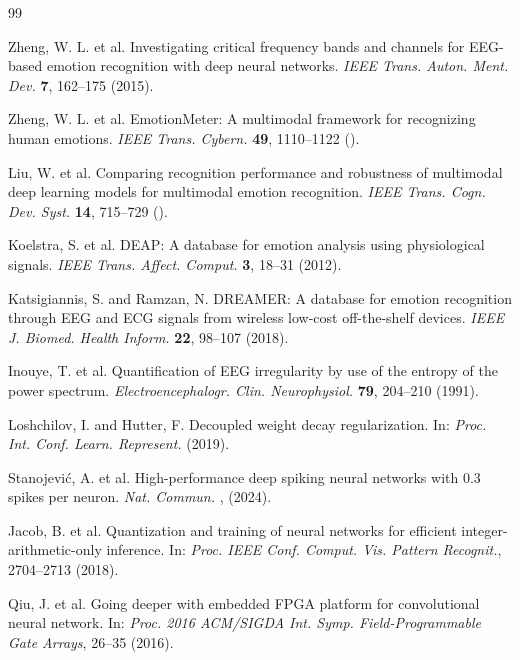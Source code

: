 \documentclass[12pt]{article}
\providecommand{\DIFaddtex}[1]{{\protect\color{blue}\sf #1}}
\providecommand{\DIFadd}[1]{\texorpdfstring{\DIFaddtex{#1}}{#1}}
\providecommand{\DIFaddbegin}{}
\providecommand{\DIFaddend}{}
\begin{document}
 \begin{thebibliography}{99}

Zheng, W. L. et al.
Investigating critical frequency bands and channels for EEG-based emotion recognition with deep neural networks.
\textit{IEEE Trans. Auton. Ment. Dev.} \textbf{7}, 162--175 (2015).

Zheng, W. L. et al.
EmotionMeter: A multimodal framework for recognizing human emotions.
\textit{IEEE Trans. Cybern.} \textbf{49}, 1110--1122 (\DIFaddbegin \DIFadd{2019}\DIFaddend).

Liu, W. et al.
Comparing recognition performance and robustness of multimodal deep learning models for multimodal emotion recognition.
\textit{IEEE Trans. Cogn. Dev. Syst.} \textbf{14}, 715--729 (\DIFaddbegin \DIFadd{2022}\DIFaddend).

Koelstra, S. et al.
DEAP: A database for emotion analysis using physiological signals.
\textit{IEEE Trans. Affect. Comput.} \textbf{3}, 18--31 (2012).

Katsigiannis, S. and Ramzan, N.
DREAMER: A database for emotion recognition through EEG and ECG signals \DIFaddbegin \DIFadd{from wireless low-cost off-the-shelf devices}\DIFaddend .
\textit{IEEE J. Biomed. Health Inform.} \textbf{22}, 98--107 (2018).

Inouye, T. et al.
Quantification of EEG irregularity by use of the entropy of the power spectrum.
\textit{Electroencephalogr. Clin. Neurophysiol.} \textbf{79}, 204--210 (1991).

 \DIFaddbegin {}
\DIFadd{Loshchilov, I. and Hutter, F.
Decoupled weight decay regularization.
In: \textit{Proc. Int. Conf. Learn. Represent.} (2019).
}

\DIFadd{Stanojevi\'{c}, A. et al.
High-performance deep spiking neural networks with 0.3 spikes per neuron.
}\DIFaddend \textit{ \DIFaddbegin \DIFadd{Nat}\DIFaddend .  \DIFaddbegin \DIFadd{Commun}\DIFaddend .} \textbf{ \DIFaddbegin \DIFadd{15}\DIFaddend },  \DIFaddbegin \DIFadd{6793 (2024}\DIFaddend ).

Jacob, B. et al.
Quantization and training of neural networks for efficient integer-arithmetic-only inference.
In: \textit{Proc. IEEE Conf. Comput. Vis. Pattern Recognit.}, 2704--2713 (2018).

Qiu, J. et al.
Going deeper with embedded FPGA platform for convolutional neural network.
In: \textit{Proc. 2016 ACM/SIGDA Int. Symp. Field-Programmable Gate Arrays}, 26--35 (2016).

\end{thebibliography}
\end{document}
